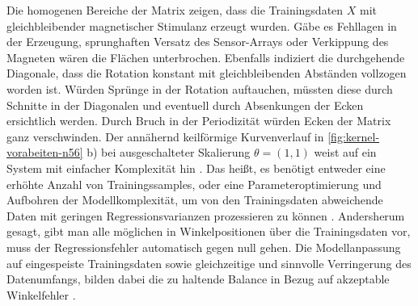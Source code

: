 \clearpage


Die homogenen Bereiche der Matrix zeigen, dass die Trainingsdaten $X$ mit gleichbleibender magnetischer Stimulanz erzeugt wurden. Gäbe es Fehllagen in der Erzeugung, sprunghaften Versatz des Sensor-Arrays oder Verkippung des Magneten wären die Flächen unterbrochen. Ebenfalls indiziert die durchgehende Diagonale, dass die Rotation konstant mit gleichbleibenden Abständen vollzogen worden ist. Würden Sprünge in der Rotation auftauchen, müssten diese durch Schnitte in der Diagonalen und eventuell durch Absenkungen der Ecken ersichtlich werden. Durch Bruch in der Periodizität würden Ecken der Matrix ganz verschwinden.
\newline
Der annähernd keilförmige Kurvenverlauf in \autoref{fig:kernel-vorabeiten-n56} b) bei ausgeschalteter Skalierung $\theta = (1,1)$ weist auf ein System mit einfacher Komplexität hin \cite{Rasmussen2006}. Das heißt, es benötigt entweder eine erhöhte Anzahl von Trainingssamples, oder eine Parameteroptimierung und Aufbohren der Modellkomplexität, um von den Trainingsdaten abweichende Daten mit geringen Regressionsvarianzen prozessieren zu können \cite{Rasmussen2006}. Andersherum gesagt, gibt man alle möglichen in Winkelpositionen über die Trainingsdaten vor, muss der Regressionsfehler automatisch gegen null gehen. Die Modellanpassung auf eingespeiste Trainingsdaten sowie gleichzeitige und sinnvolle Verringerung des Datenumfangs, bilden dabei die zu haltende Balance in Bezug auf akzeptable Winkelfehler \cite{Rasmussen2006}. 

 